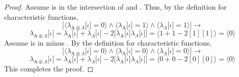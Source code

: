 \documentclass[preview]{standalone}
\begin{document}
\begin{proof}
     Assume \bm{$\iota$} is in the intersection of  and \bm{$\Lambda$}.
    Thus, by the definition for characteristic functions,
    \begin{equation*}
        \bigg[
            \Big \langle \lambda_{\mathrm{A} \oplus \Lambda} \big[ \iota \big] = 0 \Big \rangle
                \land 
            \Big \langle \lambda_{\mathrm{A}} \big[ \iota \big] = 1 \Big \rangle
                \land 
            \Big \langle \lambda_{\Lambda} \big[ \iota \big] = 1 \Big \rangle
        \bigg]
            \rightarrow
    \end{equation*}
    \begin{equation*}
        \lambda_{\mathrm{A} \oplus \Lambda} \big[ \iota \big] 
            =
        \lambda_{\mathrm{A}} \big[ \iota \big] 
            + 
        \lambda_{\Lambda} \big[ \iota \big] 
            - 
        2 \Big[ \lambda_{\mathrm{A}} \big[ \iota \big] \lambda_{\Lambda} \big[ \iota \big] \Big]
            = 
        \Big \langle 1 + 1 - 2[1][1] \Big \rangle
            = 
        \Big \langle 0 \Big \rangle
    \end{equation*}
     Assume \bm{$\iota$} is in \bm{$\Omega$} minus .
    By the definition for characteristic functions, 
    \begin{equation*}
        \bigg[
            \Big \langle \lambda_{\mathrm{A} \oplus \Lambda} \big[ \iota \big] = 0 \Big \rangle
                \land 
            \Big \langle \lambda_{\mathrm{A}} \big[ \iota \big] = 0 \Big \rangle
                \land 
            \Big \langle \lambda_{\Lambda} \big[ \iota \big] = 0 \Big \rangle
        \bigg]
            \rightarrow
    \end{equation*}
    \begin{equation*}
        \lambda_{\mathrm{A} \oplus \Lambda} \big[ \iota \big] 
            =
        \lambda_{\mathrm{A}} \big[ \iota \big] 
            + 
        \lambda_{\Lambda} \big[ \iota \big] 
            - 
        2 \Big[ \lambda_{\mathrm{A}} \big[ \iota \big] \lambda_{\Lambda} \big[ \iota \big] \Big]
            = 
        \Big \langle 0 + 0 - 2[ 0 ] [ 0 ] \Big \rangle
            = 
        \Big \langle 0 \Big \rangle
    \end{equation*}
    This completes the proof.
\end{proof}
\end{document}
